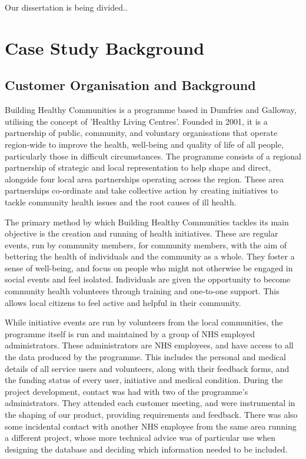 \documentclass{l3proj}
\begin{document}

Our dissertation is being divided..

\section{Case Study Background}

\subsection{Customer Organisation and Background}
\label{customer}

Building Healthy Communities is a programme based in Dumfries and Galloway, utilising the concept of 'Healthy Living Centres'. Founded in 2001, it is a partnership of public, community, and voluntary organisations that operate region-wide to improve the health, well-being and quality of life of all people, particularly those in difficult circumstances. The programme consists of a regional partnership of strategic and local representation to help shape and direct, alongside four local area partnerships operating across the region. These area partnerships co-ordinate and take collective action by creating initiatives to tackle community health issues and the root causes of ill health.

The primary method by which Building Healthy Communities tackles its main objective is the creation and running of health initiatives. These are regular events, run by community members, for community members, with the aim of bettering the health of individuals and the community as a whole. They foster a sense of well-being, and focus on people who might not otherwise be engaged in social events and feel isolated. Individuals are given the opportunity to become community health volunteers through training and one-to-one support. This allows local citizens to feel active and helpful in their community.

While initiative events are run by volunteers from the local communities, the programme itself is run and maintained by a group of NHS employed administrators. These administrators are NHS employees, and have access to all the data produced by the programme. This includes the personal and medical details of all service users and volunteers, along with their feedback forms, and the funding status of every user, initiative and medical condition. During the project development, contact was had with two of the programme's administrators. They attended each customer meeting, and were instrumental in the shaping of our product, providing requirements and feedback. There was also some incidental contact with another NHS employee from the same area running a different project, whose more technical advice was of particular use when designing the database and deciding which information needed to be included.
\end{document}
